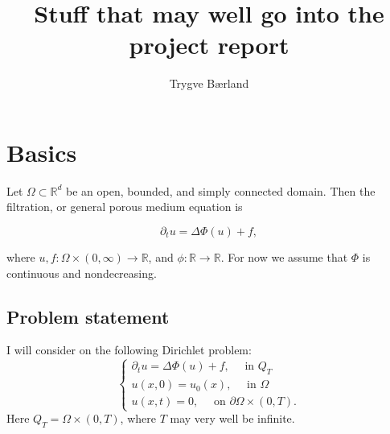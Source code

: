 \documentclass[11pt, a4paper]{article}
\begin{document}
\title{Stuff that may well go into the project report}
\author{Trygve Bærland}
\maketitle
{}

\theoremstyle{plain}
\newtheorem{theorem}{Theorem}[section]
\newtheorem{proposition}{Proposition}[section]
\newtheorem{cor}{Corollary}[section]
\newtheorem{lemma}{Lemma}[section]

\theoremstyle{definition}
\newtheorem{mydef}{Definition}[section]
\newtheorem{example}{Example}[section]

\newtheorem{obs}{Observation}
\newtheorem{rem}{Remark}


\section{Basics}


Let $\Omega \subset \mathbb{R}^d$ be an open, bounded, and simply connected domain. Then the filtration, or general porous medium equation is

\begin{equation}
\label{GPME}
	\partial_t u = \Delta \Phi(u) + f,
\end{equation}

 where $u, f: \Omega \times (0,\infty) \to \mathbb{R}$, and $\phi: \mathbb{R} \to \mathbb{R}$. For now we assume that $\Phi$ is continuous and nondecreasing.


\subsection{Problem statement}
I will consider on the following Dirichlet problem:
\begin{equation}
\label{HDP}
	\begin{cases}
		\partial_t u = \Delta \Phi(u) + f, \quad \text{ in } Q_T \\
		u(x,0) = u_0(x), \quad \text{ in } \Omega \\
		u(x,t) = 0, \quad \text{ on } \partial\Omega \times (0,T).
	\end{cases}
\end{equation}
Here $Q_T = \Omega \times (0,T)$, where $T$ may very well be infinite.
\end{document}
